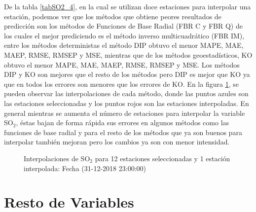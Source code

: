 De la tabla \ref{tabSO2_4}, en la cual se utilizan doce estaciones para interpolar una estación, podemos ver que los métodos que obtiene peores resultados de predicción son los métodos de Funciones de Base Radial (FBR C y FBR Q) de los cuales el mejor prediciendo es el método inverso multicuadrático (FBR IM), entre los métodos deterministas el método DIP obtuvo el menor MAPE, MAE, MAEP, RMSE, RMSEP y MSE, mientras que de los métodos geoestadísticos, KO obtuvo el menor MAPE, MAE, MAEP, RMSE, RMSEP y MSE. Los métodos DIP y KO son mejores que el resto de los métodos pero DIP es mejor que KO ya que en todos los errores son menores que los errores de KO. En la figura \ref{SO2figure4}, se pueden observar las interpolaciones de cada método, donde las puntos azules son las estaciones seleccionadas y los puntos rojos son las estaciones interpoladas. En general mientras se aumenta el número de estaciones para interpolar la variable SO$_{2}$, éstas bajan de forma rápida sus errores en algunos métodos como las funciones de base radial y para el resto de los métodos que ya son buenos para interpolar también mejoran pero los cambios ya son con menor intensidad.


\begin{figure}[H]
\centering
{}
\subfigure[KO] {\texttt{[image: ./ok\_12\_7\_26302]}}
\subfigure[KU] {\texttt{[image: ./uk\_12\_7\_26302]}}
\caption{Interpolaciones de SO$_{2}$ para 12 estaciones seleccionadas y 1 estación interpolada: Fecha (31-12-2018 23:00:00)}
\label{SO2figure4}
\end{figure}






\section{Resto de Variables} 

